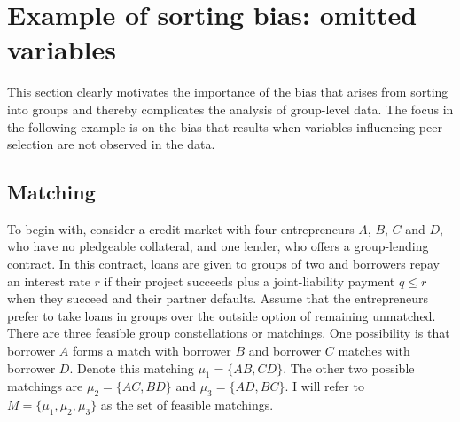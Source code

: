 \section{Example of sorting bias: omitted variables} \label{Section:Example} 

This section clearly motivates the importance of the bias that arises from sorting into groups and thereby complicates the analysis of group-level data. The focus in the following example is on the bias that results when variables influencing peer selection are not observed in the data. %



\subsection{Matching}

To begin with, consider a credit market with four entrepreneurs $A$, $B$, $C$ and $D$, who have no pledgeable collateral, and one lender, who offers a group-lending contract. In this contract, loans are given to groups of two and borrowers repay an interest rate $r$ if their project succeeds plus a joint-liability payment $q\leq r$ when they succeed and their partner defaults. Assume that the entrepreneurs prefer to take loans in groups over the outside option of remaining unmatched.
There are three feasible group constellations or matchings. One possibility is that borrower $A$ forms a match with borrower $B$ and borrower $C$ matches with borrower $D$. Denote this matching $\mu_1=\{ AB, CD \}$. The other two possible matchings are $\mu_2=\{ AC, BD \}$ and $\mu_3=\{ AD, BC \}$. I will refer to $M=\{ \mu_1, \mu_2, \mu_3\}$ as the set of feasible matchings. 


